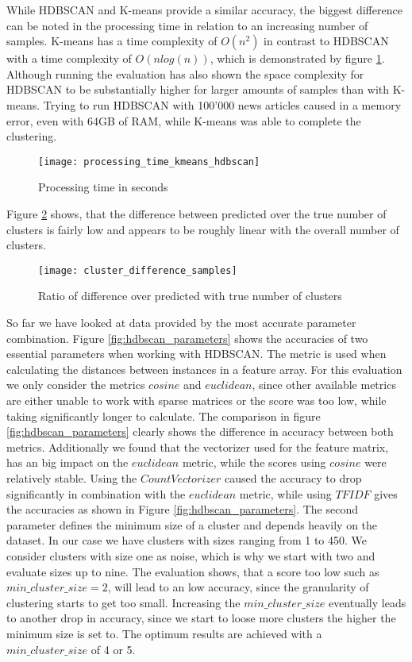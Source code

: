 While HDBSCAN and K-means provide a similar accuracy, the biggest difference can be noted in the processing time in relation to an increasing number of samples. K-means has a time complexity of $O(n^2)$ in contrast to HDBSCAN with a time complexity of $O(nlog(n))$, which is demonstrated by figure \ref{fig:processing_time_kmeans_hdbscan}. Although running the evaluation has also shown the space complexity for HDBSCAN to be substantially higher for larger amounts of samples than with K-means. Trying to run HDBSCAN with 100'000 news articles caused in a memory error, even with 64GB of RAM, while K-means was able to complete the clustering.


\begin{figure}[h]
    \centering
    \texttt{[image: processing\_time\_kmeans\_hdbscan]}
    \caption{Processing time in seconds }
    \label{fig:processing_time_kmeans_hdbscan}
\end{figure}

Figure \ref{fig:cluster_difference_samples} shows, that the difference between predicted over the true number of clusters is fairly low and appears to be roughly linear with the overall number of clusters.  

\begin{figure}[h]
    \centering
    \texttt{[image: cluster\_difference\_samples]}
    \caption{Ratio of difference over predicted with true number of clusters}
    \label{fig:cluster_difference_samples}
\end{figure}

So far we have looked at data provided by the most accurate parameter combination. Figure \ref{fig:hdbscan_parameters} shows the accuracies of two essential parameters when working with HDBSCAN. The metric is used when calculating the distances between instances in a feature array. For this evaluation we only consider the metrics $cosine$ and $euclidean$, since other available metrics are either unable to work with sparse matrices or the score was too low, while taking significantly longer to calculate. The comparison in figure \ref{fig:hdbscan_parameters} clearly shows the difference in accuracy between both metrics. Additionally we found that the vectorizer used for the feature matrix, has an big impact on the $euclidean$ metric, while the scores using $cosine$ were relatively stable. Using the $CountVectorizer$ caused the accuracy to drop significantly in combination with the $euclidean$ metric, while using $TFIDF$ gives the accuracies as shown in Figure \ref{fig:hdbscan_parameters}. The second parameter defines the minimum size of a cluster and depends heavily on the dataset. In our case we have clusters with sizes ranging from 1 to 450. We consider clusters with size one as noise, which is why we start with two and evaluate sizes up to nine. The evaluation shows, that a score too low such as $min\_cluster\_size=2$, will lead to an low accuracy, since the granularity of clustering starts to get too small. Increasing the $min\_cluster\_size$ eventually leads to another drop in accuracy, since we start to loose more clusters the higher the minimum size is set to. The optimum results are achieved with a $min\_cluster\_size$ of 4 or 5.

